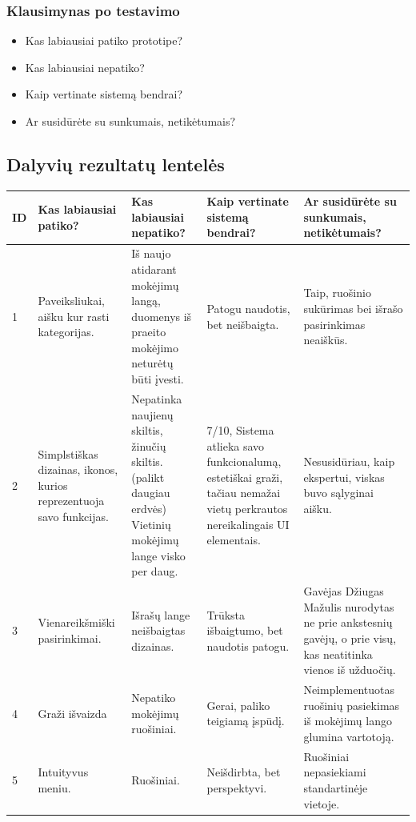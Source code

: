 \documentclass[oneside]{VUMIFPSkursinis}
\begin{document}
\subsubsection{Klausimynas po testavimo}
	\begin{itemize}
			\item Kas labiausiai patiko prototipe?
			\item Kas labiausiai nepatiko?
			\item Kaip vertinate sistemą bendrai?
			\item Ar susidūrėte su sunkumais, netikėtumais?
	\end{itemize}
\subsection{Dalyvių rezultatų lentelės}
\begin{center}
	\begin{tabular}{ |p{1cm} | p{3cm} | p{4cm} | p{4cm} | p{3cm} |}
	\hline
ID&Kas labiausiai patiko?&Kas labiausiai nepatiko?&Kaip vertinate sistemą bendrai?&Ar susidūrėte su sunkumais, netikėtumais?\\ \hline
1&Paveiksliukai, aišku kur rasti kategorijas.&Iš naujo atidarant mokėjimų langą, duomenys iš praeito mokėjimo neturėtų būti įvesti.&Patogu naudotis, bet neišbaigta.&Taip, ruošinio sukūrimas bei išrašo pasirinkimas neaiškūs. \\ \hline
2&Simplstiškas dizainas, ikonos, kurios reprezentuoja savo funkcijas.&Nepatinka naujienų skiltis, žinučių skiltis.(palikt daugiau erdvės) Vietinių mokėjimų lange visko per daug.&7/10, Sistema atlieka savo funkcionalumą, estetiškai graži, tačiau nemažai vietų perkrautos nereikalingais UI elementais. & Nesusidūriau, kaip ekspertui, viskas buvo sąlyginai aišku. \\ \hline
3&Vienareikšmiški pasirinkimai.&Išrašų lange neišbaigtas dizainas.& Trūksta išbaigtumo, bet naudotis patogu.&Gavėjas Džiugas Mažulis nurodytas ne prie ankstesnių gavėjų, o prie visų, kas neatitinka vienos iš užduočių. \\ \hline
4&Graži išvaizda&Nepatiko mokėjimų ruošiniai.&Gerai, paliko teigiamą įspūdį.& Neimplementuotas ruošinių pasiekimas iš mokėjimų lango glumina vartotoją.\\ \hline
5&Intuityvus meniu.&Ruošiniai.&Neišdirbta, bet perspektyvi.&Ruošiniai nepasiekiami standartinėje vietoje.\\ \hline
\end{tabular}
\end{center}
\end{document}

